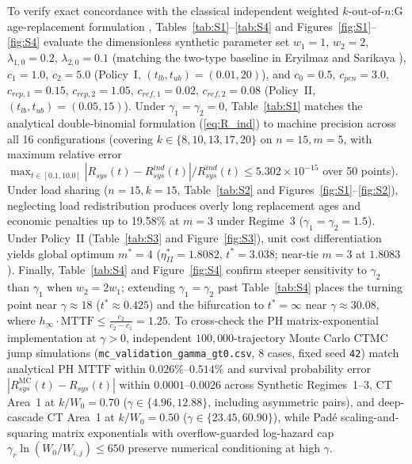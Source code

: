 \documentclass[10pt,a4paper]{article}
\begin{document}
To verify exact concordance with the classical independent weighted $k$-out-of-$n$:G age-replacement formulation \cite{wu1994,nakagawa2005,eryilmaz2014two}, Tables~\ref{tab:S1}--\ref{tab:S4} and Figures~\ref{fig:S1}--\ref{fig:S4} evaluate the dimensionless synthetic parameter set $w_1 = 1$, $w_2 = 2$, $\lambda_{1,0} = 0.2$, $\lambda_{2,0} = 0.1$ (matching the two-type baseline in Eryilmaz and Sarikaya \cite{eryilmaz2014two}), $c_1 = 1.0$, $c_2 = 5.0$ (Policy~I, $(t_{lb}, t_{ub}) = (0.01, 20)$), and $c_0 = 0.5$, $c_{pen} = 3.0$, $c_{rep,1} = 0.15$, $c_{rep,2} = 1.05$, $c_{ref,1} = 0.02$, $c_{ref,2} = 0.08$ (Policy~II, $(t_{lb}, t_{ub}) = (0.05, 15)$). Under $\gamma_1 = \gamma_2 = 0$, Table~\ref{tab:S1} matches the analytical double-binomial formulation (\ref{eq:R_ind}) to machine precision across all 16 configurations (covering $k \in \{8, 10, 13, 17, 20\}$ on $n=15, m=5$, with maximum relative error $\max_{t \in [0.1, 10.0]} |R_{sys}(t) - R_{sys}^{ind}(t)| / R_{sys}^{ind}(t) \le 5.302 \times 10^{-15}$ over 50 points). Under load sharing ($n = 15, k = 15$, Table~\ref{tab:S2} and Figures~\ref{fig:S1}--\ref{fig:S2}), neglecting load redistribution produces overly long replacement ages and economic penalties up to 19.58\% at $m = 3$ under Regime~3 ($\gamma_1 = \gamma_2 = 1.5$). Under Policy~II (Table~\ref{tab:S3} and Figure~\ref{fig:S3}), unit cost differentiation yields global optimum $m^* = 4$ ($\eta_{II}^* = 1.8082$, $t^* = 3.038$; near-tie $m = 3$ at $1.8083$). Finally, Table~\ref{tab:S4} and Figure~\ref{fig:S4} confirm steeper sensitivity to $\gamma_2$ than $\gamma_1$ when $w_2 = 2 w_1$; extending $\gamma_1 = \gamma_2$ past Table~\ref{tab:S4} places the turning point near $\gamma \approx 18$ ($t^* \approx 0.425$) and the bifurcation to $t^* = \infty$ near $\gamma \approx 30.08$, where $h_\infty \cdot \mathrm{MTTF} \le \frac{c_2}{c_2-c_1} = 1.25$. To cross-check the PH matrix-exponential implementation at $\gamma > 0$, independent $100{,}000$-trajectory Monte Carlo CTMC jump simulations (\texttt{mc\_validation\_gamma\_gt0.csv}, 8 cases, fixed seed \texttt{42}) match analytical PH $\mathrm{MTTF}$ within $0.026\%$--$0.514\%$ and survival probability error $|R_{sys}^{\mathrm{MC}}(t) - R_{sys}(t)|$ within $0.0001$--$0.0026$ across Synthetic Regimes~1--3, CT Area~1 at $k/W_0 = 0.70$ ($\gamma \in \{4.96, 12.88\}$, including asymmetric pairs), and deep-cascade CT Area~1 at $k/W_0 = 0.50$ ($\gamma \in \{23.45, 60.90\}$), while Pad\'e scaling-and-squaring matrix exponentials with overflow-guarded log-hazard cap $\gamma_r \ln(W_0/W_{i,j}) \le 650$ preserve numerical conditioning at high $\gamma$.
\end{document}
